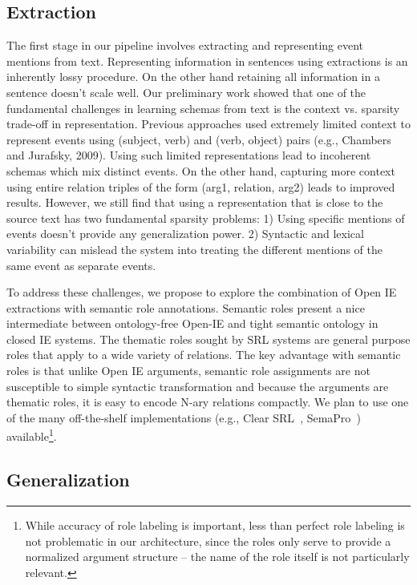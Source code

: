 \subsection{Extraction}

The first stage in our pipeline involves extracting and representing event mentions from text. Representing information in sentences using extractions is an inherently lossy procedure. On the other hand retaining all information in a sentence doesn't scale well. Our preliminary work showed that one of the fundamental challenges in learning schemas from text is the context vs. sparsity trade-off in representation. Previous approaches used extremely limited context to represent events using (subject, verb) and (verb, object) pairs (e.g., Chambers and Jurafsky, 2009). Using such limited representations lead to incoherent schemas which mix distinct events. On the other hand, capturing more context using entire relation triples of the form (arg1, relation, arg2) leads to improved results. However, we still find that using a representation that is close to the source text has two fundamental sparsity problems: 1) Using specific mentions of events doesn't provide any generalization power. 2) Syntactic and lexical variability can mislead the system into treating the different mentions of the same event as separate events. 

To address these challenges, we propose to explore the combination of Open IE extractions with semantic role annotations. Semantic roles present a nice intermediate between ontology-free Open-IE and tight semantic ontology in closed IE systems. The thematic roles sought by SRL systems are general purpose roles that apply to a wide variety of relations. The key advantage with semantic roles is that unlike Open IE arguments, semantic role assignments are not susceptible to simple syntactic transformation and because the arguments are thematic roles, it is easy to encode N-ary relations compactly. We plan to use one of the many off-the-shelf implementations (e.g., Clear SRL~\cite{}, SemaPro~\cite{}) available\footnote{While accuracy of role labeling is important, less than perfect role labeling is not problematic in our architecture, since the roles only serve to provide a normalized argument structure -- the name of the role itself is not particularly relevant.}. 

\subsection{Generalization}

